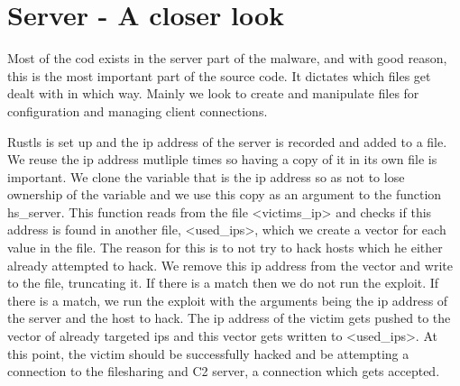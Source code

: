 \documentclass[../main.tex]{subfiles}
\begin{document}
	\section{Server -  A closer look}


Most of the cod exists in the server part of the malware, and with good reason, this is the most important part of the source code. It dictates which files get dealt with in which way.
Mainly we look to create and manipulate files for configuration and managing client connections.

Rustls is set up and the ip address of the server is recorded and added to a file. We reuse the ip address mutliple times so having a copy of it in its own file is important. We clone
the variable that is the ip address so as not to lose ownership of the variable and we use this copy as an argument to the function hs_server. This function reads from the file 
<victims_ip> and checks if this address is found in another file, <used_ips>, which we create a vector for each value in the file. The reason for this is to not try to hack hosts which he either already attempted to hack. We remove this 
ip address from the vector and write to the file, truncating it. If there is a match then we do not run the exploit. If there is a match, we run the exploit with the arguments being
the ip address of the server and the host to hack. The ip address of the victim gets pushed to the vector of already targeted ips and this vector gets written to <used_ips>. At this
point, the victim should be successfully hacked and be attempting a connection to the filesharing and C2 server, a connection which gets accepted.

	\vspace{10pt}
\end{document}
